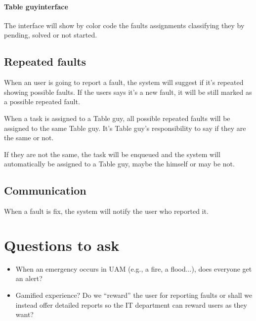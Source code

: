 \documentclass{article}
\newcommand{\tbg}{Table guy}
\begin{document}
\paragraph{\tbg interface}
The interface will show by color code the faults assignments classifying  they by pending, solved or not started.


\subsection{Repeated faults}
When an user is going to report a fault, the system will suggest if it's repeated showing possible faults. If the users says it's a new fault, it will be still marked as a possible repeated fault.

When a task is assigned to a \tbg, all possible repeated faults will be assigned to the same \tbg. It's \tbg's responsibility to say if they are the same or not.

If they are not the same, the task will be enqueued and the system will automatically be assigned to a \tbg, maybe the himself or may be not.


\subsection{Communication}

When a fault is fix, the system will notify the user who reported it.

\section{Questions to ask}

\begin{itemize}
\item When an emergency occurs in UAM (e.g., a fire, a flood...), does everyone get an alert?
\item Gamified experience? Do we ``reward'' the user for reporting faults or shall we instead offer detailed reports so the IT department can reward users as they want?

\end{itemize}
\end{document}
